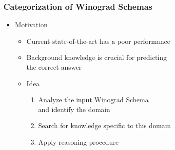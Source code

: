 \documentclass[c,8pt,xcolor...,x11names]{beamer}
\begin{document}
\begin{frame}[fragile]
\frametitle{Categorization of Winograd Schemas}

	\begin{itemize}		
	\normalsize
	\item Motivation
	\begin{itemize}
		\normalsize
		\item Current state-of-the-art has a poor performance
		\item Background knowledge is crucial for predicting\\ the correct answer 
		\onslide<2->			\item Idea
		\onslide<2->		\begin{enumerate}
			\normalsize 
			\item Analyze the input Winograd Schema \\and identify the domain
			\item Search for knowledge \alert{specific} to this domain
			\item Apply reasoning procedure 
		\end{enumerate}
	\end{itemize}
\end{itemize}   
\end{frame}
\end{document}
